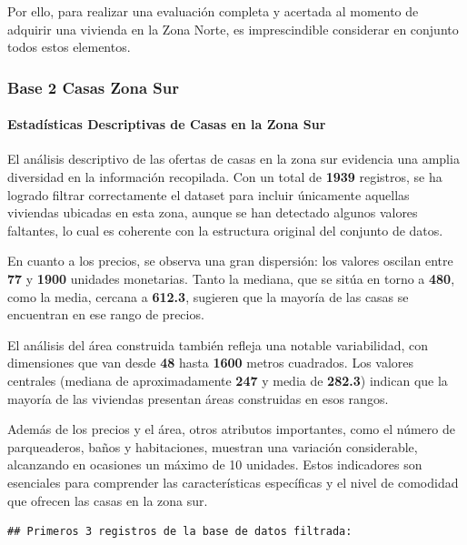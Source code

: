 \documentclass[
]{article}
\begin{document}
Por ello, para realizar una evaluación completa y acertada al momento de
adquirir una vivienda en la Zona Norte, es imprescindible considerar en
conjunto todos estos elementos.

\subsubsection{\texorpdfstring{\textbf{Base 2 Casas Zona
Sur}}{Base 2 Casas Zona Sur}}\label{base-2-casas-zona-sur}

\paragraph{\texorpdfstring{\textbf{Estadísticas Descriptivas de Casas en
la Zona
Sur}}{Estadísticas Descriptivas de Casas en la Zona Sur}}\label{estaduxedsticas-descriptivas-de-casas-en-la-zona-sur}

El análisis descriptivo de las ofertas de casas en la zona sur evidencia
una amplia diversidad en la información recopilada. Con un total de
\textbf{1939} registros, se ha logrado filtrar correctamente el dataset
para incluir únicamente aquellas viviendas ubicadas en esta zona, aunque
se han detectado algunos valores faltantes, lo cual es coherente con la
estructura original del conjunto de datos.

En cuanto a los precios, se observa una gran dispersión: los valores
oscilan entre \textbf{77} y \textbf{1900} unidades monetarias. Tanto la
mediana, que se sitúa en torno a \textbf{480}, como la media, cercana a
\textbf{612.3}, sugieren que la mayoría de las casas se encuentran en
ese rango de precios.

El análisis del área construida también refleja una notable
variabilidad, con dimensiones que van desde \textbf{48} hasta
\textbf{1600} metros cuadrados. Los valores centrales (mediana de
aproximadamente \textbf{247} y media de \textbf{282.3}) indican que la
mayoría de las viviendas presentan áreas construidas en esos rangos.

Además de los precios y el área, otros atributos importantes, como el
número de parqueaderos, baños y habitaciones, muestran una variación
considerable, alcanzando en ocasiones un máximo de 10 unidades. Estos
indicadores son esenciales para comprender las características
específicas y el nivel de comodidad que ofrecen las casas en la zona
sur.

\begin{verbatim}
## Primeros 3 registros de la base de datos filtrada:
\end{verbatim}
\end{document}
